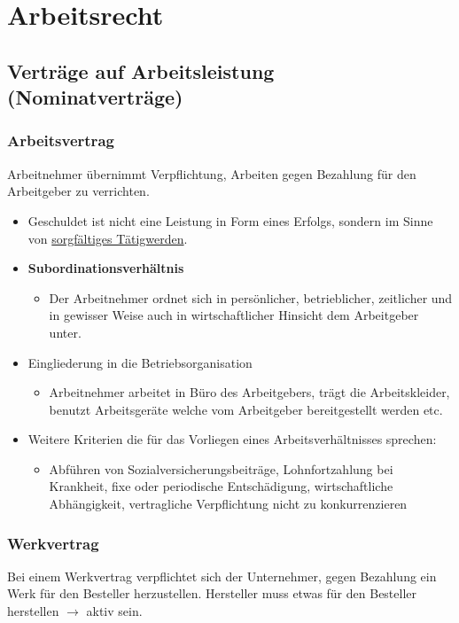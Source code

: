 \section{Arbeitsrecht}

\subsection{Verträge auf Arbeitsleistung (Nominatverträge)}

\subsubsection{Arbeitsvertrag}
Arbeitnehmer übernimmt Verpflichtung, Arbeiten gegen Bezahlung für den Arbeitgeber zu verrichten.

\begin{itemize}
    \item Geschuldet ist nicht eine Leistung in Form eines Erfolgs, sondern im Sinne von \underline{sorgfältiges Tätigwerden}.
    \item \textbf{Subordinationsverhältnis}
    \begin{itemize}
        \item Der Arbeitnehmer ordnet sich in persönlicher, betrieblicher, zeitlicher und in gewisser Weise auch in wirtschaftlicher Hinsicht dem Arbeitgeber unter. 
    \end{itemize}
    \item Eingliederung in die Betriebsorganisation
    \begin{itemize}
        \item Arbeitnehmer arbeitet in Büro des Arbeitgebers, trägt die Arbeitskleider, benutzt Arbeitsgeräte welche vom Arbeitgeber bereitgestellt werden etc.
    \end{itemize}
    \item Weitere Kriterien die für das Vorliegen eines Arbeitsverhältnisses sprechen:
    \begin{itemize}
        \item Abführen von Sozialversicherungsbeiträge, Lohnfortzahlung bei Krankheit, fixe oder periodische Entschädigung, wirtschaftliche Abhängigkeit, vertragliche Verpflichtung nicht zu konkurrenzieren
    \end{itemize}
\end{itemize}

\subsubsection{Werkvertrag}
\label{arbeitsrecht:werkvertrag}
Bei einem Werkvertrag verpflichtet sich der Unternehmer, gegen Bezahlung ein Werk für den Besteller herzustellen. Hersteller muss etwas für den Besteller herstellen $\rightarrow$ aktiv sein.

